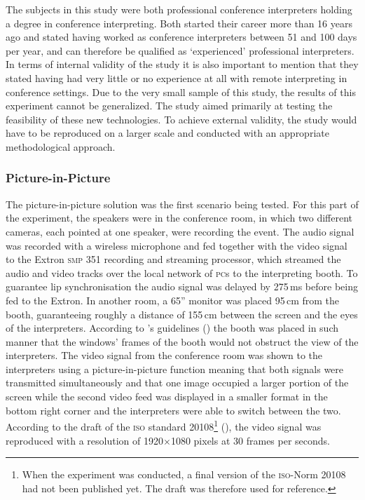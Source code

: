 \documentclass[output=paper]{langsci/langscibook}
\begin{document}
The subjects in this study were both professional conference interpreters holding a degree in conference interpreting. Both started their career more than 16 years ago and stated having worked as conference interpreters between 51 and 100 days per year, and can therefore be qualified as ‘experienced’ professional interpreters. In terms of internal validity of the study it is also important to mention that they stated having had very little or no experience at all with remote interpreting in conference settings. Due to the very small sample of this study, the results of this experiment cannot be generalized. The study aimed primarily at testing the feasibility of these new technologies. To achieve external validity, the study would have to be reproduced on a larger scale and conducted with an appropriate methodological approach.

\subsubsection{Picture-in-Picture} 
\largerpage
The picture-in-picture solution was the first scenario being tested. For this part of the experiment, the speakers were in the conference room, in which two different cameras, each pointed at one speaker, were recording the event. The audio signal was recorded with a wireless microphone and fed together with the video signal to the Extron \textsc{smp 351} recording and streaming processor, which streamed the audio and video tracks over the local network of \textsc{pc}s to the interpreting booth. To guarantee lip synchronisation the audio signal was delayed by 275\,ms before being fed to the Extron. In another room, a 65” monitor was placed 95\,cm from the booth, guaranteeing roughly a distance of 155\,cm between the screen and the eyes of the interpreters. According to \citeauthor{Causo2011}’s guidelines (\citeyear[2]{Causo2011}) the booth was placed in such manner that the windows’ frames of the booth would not obstruct the view of the interpreters. The video signal from the conference room was shown to the interpreters using a picture-in-picture function meaning that both signals were transmitted simultaneously and that one image occupied a larger portion of the screen while the second video feed was displayed in a smaller format in the bottom right corner and the interpreters were able to switch between the two. According to the draft of the \textsc{iso} standard 20108\footnote{When the experiment was conducted, a final version of the \textsc{iso}-Norm 20108 had not been published yet. The draft was therefore used for reference.} (\citeyear[6]{ISO20108}), the video signal was reproduced with a resolution of 1920$\times$1080 pixels at 30 frames per seconds. 
\end{document}
